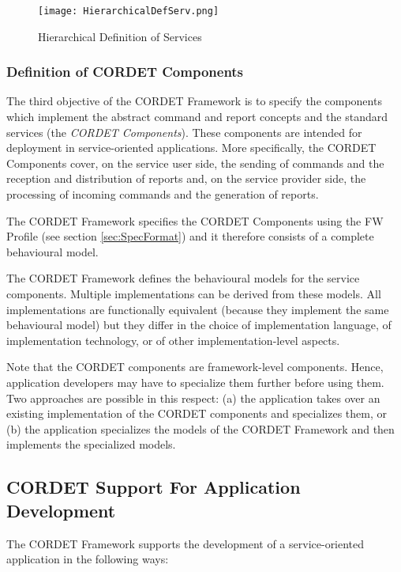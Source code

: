 \documentclass{pnp_article}
\begin{document}
\begin{figure}[ht]
 \centering
 \texttt{[image: HierarchicalDefServ.png]}
 \caption{Hierarchical Definition of Services}
 \label{fig:HierarchicalDefServ}
\end{figure}


\subsubsection{Definition of CORDET Components}\label{sec:crComponents}
The third objective of the CORDET Framework is to specify the components which implement the abstract command and report concepts and the standard services (the \textit{CORDET Components}). These components are intended for deployment in service-oriented applications. More specifically, the CORDET Components cover, on the service user side, the sending of commands and the reception and distribution of reports and, on the service provider side, the processing of incoming commands and the generation of reports.

The CORDET Framework specifies the CORDET Components using the FW Profile (see section \ref{sec:SpecFormat}) and it therefore consists of a complete behavioural model.  

The CORDET Framework defines the behavioural models for the service components. Multiple implementations can be derived from these models. All implementations are functionally equivalent (because they implement the same behavioural model) but they differ in the choice of implementation language, of implementation technology, or of other implementation-level aspects. 

Note that the CORDET components are framework-level components. Hence, application developers may have to specialize them further before using them. Two approaches are possible in this respect: (a) the application takes over an existing implementation of the CORDET components and specializes them, or (b) the application specializes the models of the CORDET Framework and then implements the specialized models.

\subsection{CORDET Support For Application Development}\label{sec:CrSupportForAppDev} 

The CORDET Framework supports the development of a service-oriented application in the following ways:
\end{document}
